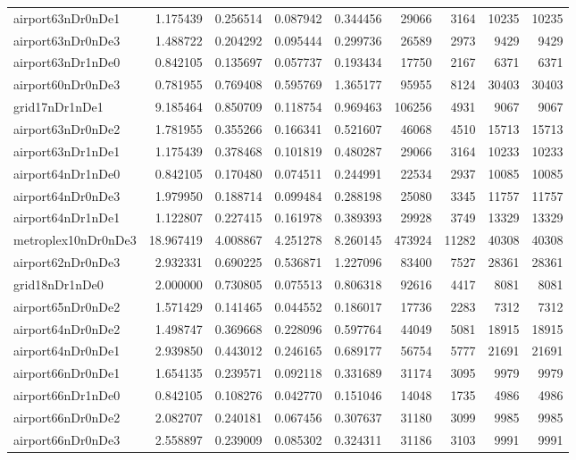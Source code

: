 \begin{longtable}{|l|r|r|r|r|r|r|r|r|}
airport63nDr0nDe1 & 1.175439 & 0.256514 & 0.087942 & 0.344456 & 29066 & 3164 & 10235 & 10235 \\
airport63nDr0nDe3 & 1.488722 & 0.204292 & 0.095444 & 0.299736 & 26589 & 2973 & 9429 & 9429 \\
airport63nDr1nDe0 & 0.842105 & 0.135697 & 0.057737 & 0.193434 & 17750 & 2167 & 6371 & 6371 \\
airport60nDr0nDe3 & 0.781955 & 0.769408 & 0.595769 & 1.365177 & 95955 & 8124 & 30403 & 30403 \\
grid17nDr1nDe1 & 9.185464 & 0.850709 & 0.118754 & 0.969463 & 106256 & 4931 & 9067 & 9067 \\
airport63nDr0nDe2 & 1.781955 & 0.355266 & 0.166341 & 0.521607 & 46068 & 4510 & 15713 & 15713 \\
airport63nDr1nDe1 & 1.175439 & 0.378468 & 0.101819 & 0.480287 & 29066 & 3164 & 10233 & 10233 \\
airport64nDr1nDe0 & 0.842105 & 0.170480 & 0.074511 & 0.244991 & 22534 & 2937 & 10085 & 10085 \\
airport64nDr0nDe3 & 1.979950 & 0.188714 & 0.099484 & 0.288198 & 25080 & 3345 & 11757 & 11757 \\
airport64nDr1nDe1 & 1.122807 & 0.227415 & 0.161978 & 0.389393 & 29928 & 3749 & 13329 & 13329 \\
metroplex10nDr0nDe3 & 18.967419 & 4.008867 & 4.251278 & 8.260145 & 473924 & 11282 & 40308 & 40308 \\
airport62nDr0nDe3 & 2.932331 & 0.690225 & 0.536871 & 1.227096 & 83400 & 7527 & 28361 & 28361 \\
grid18nDr1nDe0 & 2.000000 & 0.730805 & 0.075513 & 0.806318 & 92616 & 4417 & 8081 & 8081 \\
airport65nDr0nDe2 & 1.571429 & 0.141465 & 0.044552 & 0.186017 & 17736 & 2283 & 7312 & 7312 \\
airport64nDr0nDe2 & 1.498747 & 0.369668 & 0.228096 & 0.597764 & 44049 & 5081 & 18915 & 18915 \\
airport64nDr0nDe1 & 2.939850 & 0.443012 & 0.246165 & 0.689177 & 56754 & 5777 & 21691 & 21691 \\
airport66nDr0nDe1 & 1.654135 & 0.239571 & 0.092118 & 0.331689 & 31174 & 3095 & 9979 & 9979 \\
airport66nDr1nDe0 & 0.842105 & 0.108276 & 0.042770 & 0.151046 & 14048 & 1735 & 4986 & 4986 \\
airport66nDr0nDe2 & 2.082707 & 0.240181 & 0.067456 & 0.307637 & 31180 & 3099 & 9985 & 9985 \\
airport66nDr0nDe3 & 2.558897 & 0.239009 & 0.085302 & 0.324311 & 31186 & 3103 & 9991 & 9991 \\

\end{longtable}
